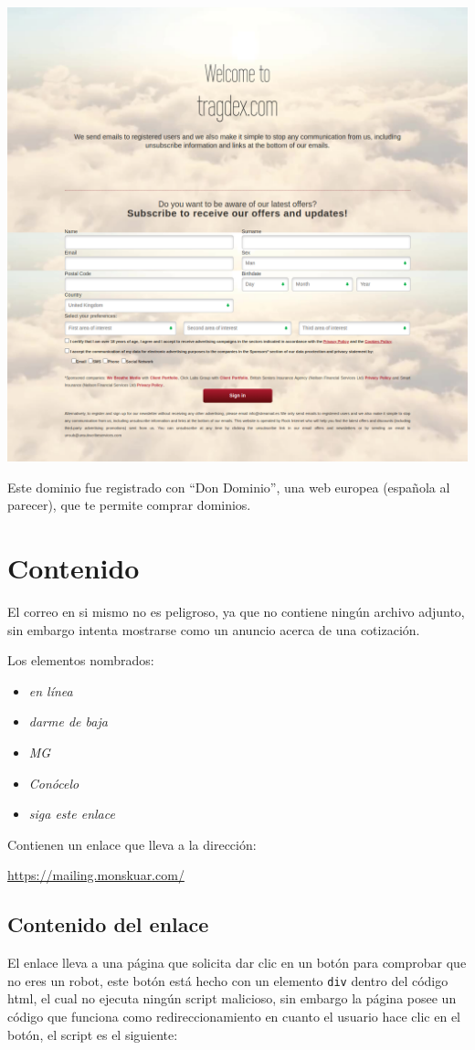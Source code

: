 \documentclass[11pt]{article}
\begin{document}
\begin{center}
\includegraphics[width=.9\linewidth]{./assets/screencapture-tragdex-2022-05-31-00_52_15.png}
\end{center}

Este dominio fue registrado con ``Don Dominio'', una web europea (española al parecer), que te permite comprar dominios.
\section{Contenido}
\label{sec:orge9a7939}
El correo en si mismo no es peligroso, ya que no contiene ningún archivo adjunto, sin embargo intenta mostrarse como un anuncio acerca de una cotización.

Los elementos nombrados:
\begin{itemize}
\item \emph{en línea}
\item \emph{darme de baja}
\item \emph{MG}
\item \emph{Conócelo}
\item \emph{siga este enlace}
\end{itemize}

Contienen un enlace que lleva a la dirección:

\url{https://mailing.monskuar.com/}

\subsection{Contenido del enlace}
\label{sec:orgdb24fc2}
El enlace lleva a una página que solicita dar clic en un botón para comprobar que no eres un robot, este botón está hecho con un elemento \texttt{div} dentro del código html, el cual no ejecuta ningún script malicioso, sin embargo la página posee un código que funciona como redireccionamiento en cuanto el usuario hace clic en el botón, el script es el siguiente:
\end{document}
